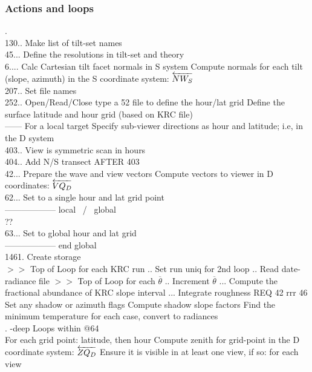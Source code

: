 \documentclass{article}
\begin{document}
\subsubsection{Actions and loops}  %
.
\\ 130.. Make list of tilt-set names
\\ 45... Define the resolutions in tilt-set and theory
\\ 6.... Calc Cartesian tilt facet normals in S system
\qii Compute normals for each tilt (slope, azimuth) in the S coordinate system: $\overleftarrow{NW_S}$
\\ 207.. Set file names
\\ 252.. Open/Read/Close type a 52 file to define the hour/lat grid
\qii  Define the surface latitude and hour grid (based on KRC file)
\\ ------ For a local target 
\qii Specify sub-viewer directions as hour and latitude; i.e, in the D system
\\ 403.. View is symmetric scan in hours
\\ 404.. Add N/S transect AFTER 403
\\ 42... Prepare the wave and view vectors
\qii Compute vectors to viewer in D coordinates: $\overleftarrow{VQ_D}$
\\ 62... Set to a single hour and lat grid point
\\ ------------------ local \ / \ global
\\ ??
\\ 63... Set to global hour and lat grid
\\ ------------------ end global
\\ 1461. Create storage
\\ $>>$ Top of Loop for each KRC run
.. Set run uniq for 2nd loop
.. Read date-radiance file
\qi $>>$ Top of Loop for each $\overline{\theta}$
.. Increment $\overline{\theta}$
... Compute the fractional abundance of KRC slope interval
... Integrate roughness REQ 42 rrr 46 
\qiii \ddag Set any shadow or azimuth flags
\qiii \ddag Compute shadow slope factors
\qiii \ddag Find the minimum temperature for each case, convert to radiances 
\\ .  -deep Loops within @64 \hrulefill \hspace{3.in}
\\ For each grid point: latitude, then hour 
\qi Compute zenith for grid-point in the D coordinate system: $\overleftarrow{ZQ_D}$
\qi Ensure it is visible in at least one view, if so: for each view
\end{document}
